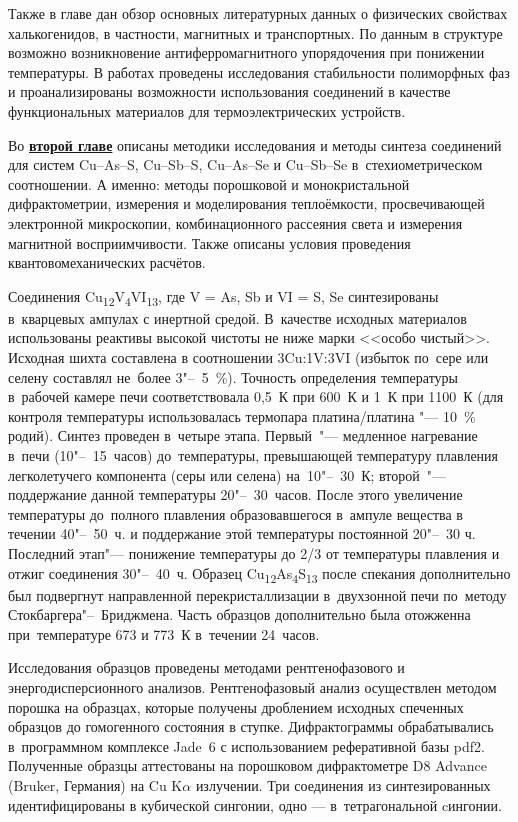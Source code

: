 Также в главе дан обзор основных литературных данных о физических свойствах халькогенидов, в частности,  магнитных и транспортных\cite{bab_81}.
По данным \cite{bab_1982,DiBenedetto2002, Bernardini2000,Gainov2008} в структуре возможно возникновение антиферромагнитного упорядочения при понижении температуры. В работах \cite{Lu2013,Lara-Curzio2014,Tablero2014,Lu2016,Nasonova2016} проведены исследования стабильности полиморфных фаз и проанализированы возможности использования соединений в качестве функциональных материалов для термоэлектрических устройств.



Во \underline{\textbf{второй главе}} описаны методики исследования и методы синтеза соединений для систем Cu--As--S, Cu--Sb--S, Cu--As--Se и Cu--Sb--Se в~стехиометрическом соотношении.
А именно: методы порошковой и монокристальной дифрактометрии, измерения и моделирования теплоёмкости, просвечивающей электронной микроскопии, комбинационного рассеяния света и измерения магнитной восприимчивости. Также описаны условия проведения квантовомеханических расчётов.

Соединения Cu\textsubscript{12}V\textsubscript{4}VI\textsubscript{13}, где V = As, Sb и VI = S, Se синтезированы в~кварцевых ампулах с инертной средой. В~качестве исходных материалов использованы реактивы высокой чистоты не ниже марки <<особо чистый>>. Исходная шихта составлена в соотношении 3Cu:1V:3VI
(избыток по~сере или селену составлял не~более 3"--~5~\%). Точность определения температуры в~рабочей камере печи соответствовала 0,5~К при 600~К и 1~К при 1100~К (для контроля температуры использовалась термопара платина/платина "--- 10~\% родий). Синтез проведен в~четыре этапа. Первый~"--- медленное нагревание в~печи (10"--~15~часов) до~температуры, превышающей температуру плавления легколетучего компонента (серы или селена) на~10"--~30~К; второй~"--- поддержание данной температуры 20"--~30~часов. После этого увеличение температуры до~полного плавления образовавшегося в~ампуле вещества в течении 40"--~50~ч. и поддержание этой температуры постоянной 20"--~30 ч. Последний этап"--- понижение температуры до 2/3 от температуры плавления и отжиг соединения 30"--~40~ч. Образец Cu\textsubscript{12}As\textsubscript{4}S\textsubscript{13} после спекания дополнительно был подвергнут направленной перекристаллизации в~двухзонной печи по~методу Стокбаргера"--~Бриджмена. Часть образцов дополнительно была отожженна при~температуре 673 и 773~К в~течении 24~часов.

Исследования образцов проведены методами рентгенофазового и энергодисперсионного анализов.
Рентгенофазовый анализ осуществлен методом порошка на образцах, которые  получены дроблением исходных спеченных образцов до гомогенного состояния в ступке. Дифрактограммы  обрабатывались в~программном комплексе Jade~6 с использованием реферативной базы pdf2. Полученные образцы аттестованы на порошковом дифрактометре D8 Advance (Bruker, Германия) на Cu K$\alpha$ излучении. Три соединения из синтезированных  идентифицированы в кубической сингонии, одно --- в~тетрагональной cингонии.

